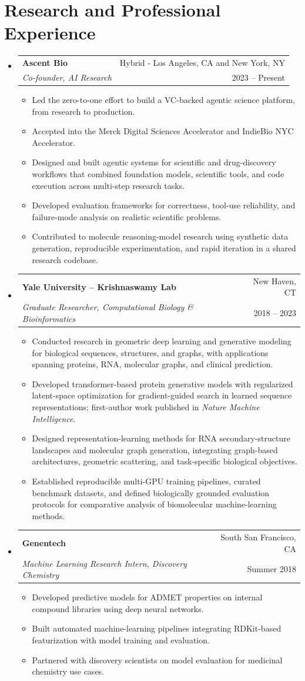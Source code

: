 \documentclass[letterpaper,11pt]{article}
\makeatletter
\newcommand{\resumeSubheading}[4]{
  \vspace{-1pt}\item
    \begin{tabular*}{\textwidth}[t]{l@{\extracolsep{\fill}}r}
      \textbf{#1} & {\small #2}\vspace{1pt}\\
      \textit{#3} & {\small #4}\\
    \end{tabular*}\vspace{-4pt}
}
\newcommand{\resumeSubHeadingListStart}{\begin{itemize}[leftmargin=0in, label={}, itemsep=6pt, topsep=3pt]}
\newcommand{\resumeSubHeadingListEnd}{\end{itemize}}
\newcommand{\resumeItemListStart}{\begin{itemize}[leftmargin=0.18in, itemsep=2pt, topsep=2pt]}
\newcommand{\resumeItemListEnd}{\end{itemize}\vspace{-2pt}}
\newcommand{\resumeItem}[1]{\item\small{{#1 \vspace{-1pt}}}}
\makeatother
\begin{document}
\section{Research and Professional Experience}
\resumeSubHeadingListStart
  \resumeSubheading
    {Ascent Bio}{Hybrid - Los Angeles, CA and New York, NY}
    {Co-founder, AI Research}{2023 -- Present}
    \resumeItemListStart
      \resumeItem{Led the zero-to-one effort to build a VC-backed agentic science platform, from research to production.}
      \resumeItem{Accepted into the Merck Digital Sciences Accelerator and IndieBio NYC Accelerator.}
      \resumeItem{Designed and built agentic systems for scientific and drug-discovery workflows that combined foundation models, scientific tools, and code execution across multi-step research tasks.}
      \resumeItem{Developed evaluation frameworks for correctness, tool-use reliability, and failure-mode analysis on realistic scientific problems.}
      \resumeItem{Contributed to molecule reasoning-model research using synthetic data generation, reproducible experimentation, and rapid iteration in a shared research codebase.}
    \resumeItemListEnd

  \resumeSubheading
    {Yale University -- Krishnaswamy Lab}{New Haven, CT}
    {Graduate Researcher, Computational Biology \& Bioinformatics}{2018 -- 2023}
    \resumeItemListStart
      \resumeItem{Conducted research in geometric deep learning and generative modeling for biological sequences, structures, and graphs, with applications spanning proteins, RNA, molecular graphs, and clinical prediction.}
      \resumeItem{Developed transformer-based protein generative models with regularized latent-space optimization for gradient-guided search in learned sequence representations; first-author work published in \textit{Nature Machine Intelligence}.}
      \resumeItem{Designed representation-learning methods for RNA secondary-structure landscapes and molecular graph generation, integrating graph-based architectures, geometric scattering, and task-specific biological objectives.}
      \resumeItem{Established reproducible multi-GPU training pipelines, curated benchmark datasets, and defined biologically grounded evaluation protocols for comparative analysis of biomolecular machine-learning methods.}
    \resumeItemListEnd

  \resumeSubheading
    {Genentech}{South San Francisco, CA}
    {Machine Learning Research Intern, Discovery Chemistry}{Summer 2018}
    \resumeItemListStart
      \resumeItem{Developed predictive models for ADMET properties on internal compound libraries using deep neural networks.}
      \resumeItem{Built automated machine-learning pipelines integrating RDKit-based featurization with model training and evaluation.}
      \resumeItem{Partnered with discovery scientists on model evaluation for medicinal chemistry use cases.}
    \resumeItemListEnd
\resumeSubHeadingListEnd
\end{document}
